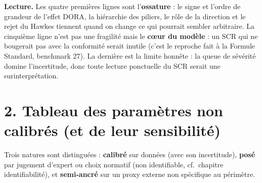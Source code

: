 \documentclass[11pt,a4paper]{article}
\begin{document}
\vspace{4pt}
\textbf{Lecture.} Les quatre premières lignes sont l'\textbf{ossature} : le signe et l'ordre
de grandeur de l'effet DORA, la hiérarchie des piliers, le rôle de la direction et le rejet
du Hawkes tiennent quand on change ce qui pourrait sembler arbitraire. La cinquième ligne
n'est pas une fragilité mais le \textbf{cœur du modèle} : un SCR qui ne bougerait pas avec la
conformité serait inutile (c'est le reproche fait à la Formule Standard, benchmark 27). La
dernière est la limite honnête : la queue de sévérité domine l'incertitude, donc toute
lecture ponctuelle du SCR serait une surinterprétation.

\section*{2. Tableau des paramètres non calibrés (et de leur sensibilité)}

Trois natures sont distinguées : \textbf{calibré} sur données (avec son incertitude),
\textbf{posé} par jugement d'expert ou choix normatif (non identifiable, cf.\ chapitre
identifiabilité), et \textbf{semi-ancré} sur un proxy externe non spécifique au périmètre.
\end{document}
